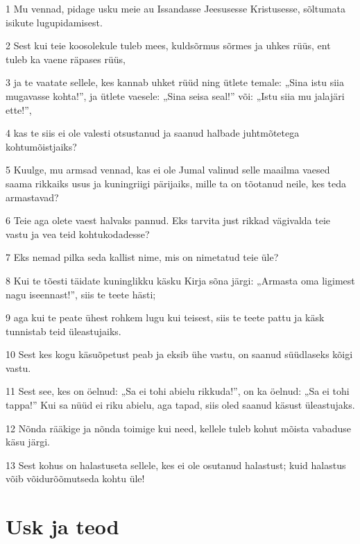 \par 1 Mu vennad, pidage usku meie au Issandasse Jeesusesse Kristusesse, sõltumata isikute lugupidamisest.
\par 2 Sest kui teie koosolekule tuleb mees, kuldsõrmus sõrmes ja uhkes rüüs, ent tuleb ka vaene räpases rüüs,
\par 3 ja te vaatate sellele, kes kannab uhket rüüd ning ütlete temale: „Sina istu siia mugavasse kohta!”, ja ütlete vaesele: „Sina seisa seal!” või: „Istu siia mu jalajäri ette!”,
\par 4 kas te siis ei ole valesti otsustanud ja saanud halbade juhtmõtetega kohtumõistjaiks?
\par 5 Kuulge, mu armsad vennad, kas ei ole Jumal valinud selle maailma vaesed saama rikkaiks usus ja kuningriigi pärijaiks, mille ta on tõotanud neile, kes teda armastavad?
\par 6 Teie aga olete vaest halvaks pannud. Eks tarvita just rikkad vägivalda teie vastu ja vea teid kohtukodadesse?
\par 7 Eks nemad pilka seda kallist nime, mis on nimetatud teie üle?
\par 8 Kui te tõesti täidate kuninglikku käsku Kirja sõna järgi: „Armasta oma ligimest nagu iseennast!”, siis te teete hästi;
\par 9 aga kui te peate ühest rohkem lugu kui teisest, siis te teete pattu ja käsk tunnistab teid üleastujaiks.
\par 10 Sest kes kogu käsuõpetust peab ja eksib ühe vastu, on saanud süüdlaseks kõigi vastu.
\par 11 Sest see, kes on öelnud: „Sa ei tohi abielu rikkuda!”, on ka öelnud: „Sa ei tohi tappa!” Kui sa nüüd ei riku abielu, aga tapad, siis oled saanud käsust üleastujaks.
\par 12 Nõnda rääkige ja nõnda toimige kui need, kellele tuleb kohut mõista vabaduse käsu järgi.
\par 13 Sest kohus on halastuseta sellele, kes ei ole osutanud halastust; kuid halastus võib võidurõõmutseda kohtu üle!

\section*{Usk ja teod}

